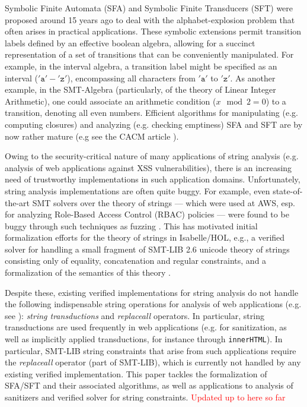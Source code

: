 Symbolic Finite Automata (SFA) and Symbolic Finite Transducers (SFT)
\cite{cav/DAntoniV17, VeanesHLMB12Transducer,DV21} were proposed around 15 years ago
to deal with the alphabet-explosion problem that often arises in practical
applications. 
%
These symbolic extensions permit transition labels defined by an effective 
boolean algebra, allowing for a succinct representation of a set of transitions
that can be conveniently manipulated. 
For example, in the interval algebra, a transition label might be specified as 
an interval ($'\texttt{a}'-'\texttt{z}'$), encompassing all characters from
$'\texttt{a}'$ to $'\texttt{z}'$. As another example, in the SMT-Algebra
(particularly, of the theory of Linear Integer Arithmetic), %
one could associate an arithmetic condition ($x \mod 2 = 0$) to a transition, 
denoting all even numbers. Efficient algorithms for manipulating (e.g. computing
closures) and analyzing (e.g. checking emptiness) SFA and SFT are by now
rather mature (e.g see the CACM article \cite{DV21}).

Owing to the security-critical nature of many applications of string analysis
(e.g. analysis of web applications against XSS vulnerabilities), there is an 
increasing need of trustworthy implementations in such application domains. 
Unfortunately, string analysis implementations are often quite buggy. For
example, even state-of-the-art SMT solvers over the theory of strings --- 
which were used at AWS, esp. for analyzing Role-Based Access Control (RBAC) 
policies --- were found to be buggy through such techniques as fuzzing
\cite{DBLP:conf/cav/BlotskyMBZKG18,BM20,Mansur20}. This has motivated
initial formalization efforts for the theory of strings in Isabelle/HOL, e.g., a verified solver
\cite{cpp/KanLRS22}
for handling a small fragment of SMT-LIB 2.6 unicode theory of strings
consisting only of equality, concatenation and regular constraints, and a
formalization of the semantics of this theory \cite{verified-verifying}.

Despite these, existing verified implementations for string analysis do not
handle the following indispensable string operations for analysis of web
applications (e.g. see
\cite{DBLP:conf/popl/LinB16,Kern,Berkeley-JavaScript,DBLP:conf/sp/SaxenaAHMMS10,uss/HooimeijerLMSV11}):
\emph{string transductions} and \emph{replaceall} operators. In particular, 
string transductions are used frequently in web applications (e.g. for
sanitization, as well as implicitly applied transductions, for instance
through \texttt{innerHTML}). In particular, SMT-LIB string constraints that 
arise from such applications require the \emph{replaceall} operator (part of
SMT-LIB), which is currently not handled by any existing verified
implementation. This paper tackles the formalization of SFA/SFT and
their associated algorithms, as well as applications to analysis of sanitizers
and verified solver for string constraints. \textcolor{red}{Updated up to here
so far}

